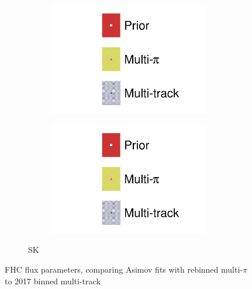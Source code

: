 \begin{figure}[h]
\begin{subfigure}[t]{\textwidth}
\begin{subfigure}[t]{0.24\textwidth}
\includegraphics[width=\textwidth,page=12, trim={0mm 0mm 0mm 9mm}, clip]{figures/mach3/2018/asimov/2018a_FixedCov_RedCov_Mpi_Asimov_merg_2018a_NewDetMatrix_OrderSwitched_Data2to8_merge}
\end{subfigure}
\begin{subfigure}[t]{0.24\textwidth}
\includegraphics[width=\textwidth,page=13, trim={0mm 0mm 0mm 9mm}, clip]{figures/mach3/2018/asimov/2018a_FixedCov_RedCov_Mpi_Asimov_merg_2018a_NewDetMatrix_OrderSwitched_Data2to8_merge}
\end{subfigure}
\caption{SK}
\end{subfigure}
	\caption{FHC flux parameters, comparing Asimov fits with rebinned multi-$\pi$ to 2017 binned multi-track}
	\label{fig:asimov_fit_2018_mpi_mtrack_fhc}
\end{figure}

